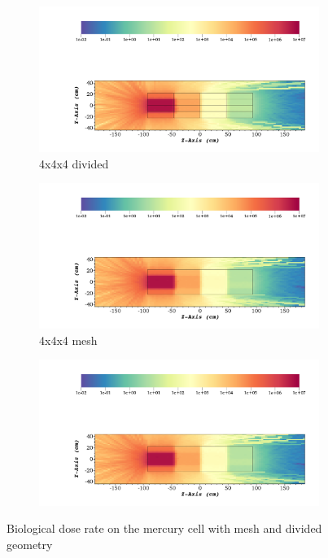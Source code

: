 \begin{figure}[H]
	\begin{subfigure}[t]{0.5\textwidth}
		\includegraphics[width=\linewidth, trim={5cm 1cm 2cm 16cm},clip]{../figs/toy_p1/dose_VPI_4x_split.png}
		\caption{4x4x4 divided}
		\label{fig:1dose_4x_split}
	\end{subfigure}\hfill
	\begin{subfigure}[t]{0.5\textwidth}
		\includegraphics[width=\linewidth, trim={5cm 1cm 2cm 16cm},clip]{../figs/toy_p1/dose_VPI_4x_mesh.png}
		\caption{4x4x4 mesh}
		\label{fig:1dose_4x_mesh}
	\end{subfigure}

	\begin{subfigure}[t]{1.0\textwidth}
		\includegraphics[width=\linewidth, trim={5cm 25cm 2cm 2cm},clip]{../figs/toy_p1/dose_VPI_4x_mesh.png}
		\label{fig:1legend}
	\end{subfigure}
	\caption{Biological dose rate on the mercury cell with mesh and divided geometry}
	\label{fig:1dose}
\end{figure}

